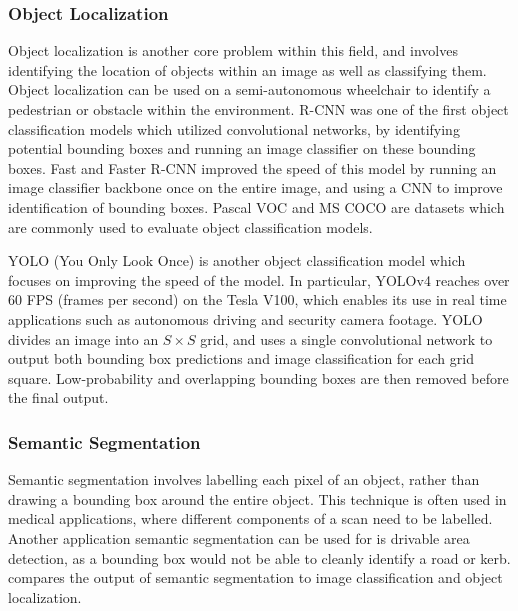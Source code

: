 \documentclass[12pt]{article}
\begin{document}
\subsubsection{Object Localization}
Object localization is another core problem within this field, and involves identifying the location of objects within an image
as well as classifying them. Object localization can be used on a semi-autonomous wheelchair to identify
a pedestrian or obstacle within the environment. R-CNN \cite{girshickRichFeatureHierarchies2013} was one of the
first object classification models which utilized convolutional networks, by identifying potential bounding boxes
and running an image classifier on these bounding boxes. Fast and Faster R-CNN \cite{girshickFastRCNN2015}\cite{renFasterRCNNRealTime2015}
improved the speed of this model by running an image classifier backbone once on the entire image, and using a CNN to improve
identification of bounding boxes. Pascal VOC \cite{everinghamPascalVisualObject2009} and MS COCO \cite{linMicrosoftCOCOCommon2014}
are datasets which are commonly used to evaluate object classification models.

YOLO (You Only Look Once) \cite{redmonYouOnlyLook2015}\cite{redmonYOLO9000BetterFaster2016}\cite{redmonYOLOv3IncrementalImprovement2018}\cite{bochkovskiyYOLOv4OptimalSpeed2020}
is another object classification model which focuses on improving the speed of the model. In particular, YOLOv4 \cite{bochkovskiyYOLOv4OptimalSpeed2020}
reaches over 60 FPS (frames per second) on the Tesla V100, which enables its use in real time applications such as autonomous driving and security camera footage. %
YOLO divides an image into an $S\times S$ grid, and uses a single convolutional network to output both bounding box predictions and
image classification for each grid square. Low-probability and overlapping bounding boxes are then removed before the final output.

\subsubsection{Semantic Segmentation}
Semantic segmentation involves labelling each pixel of an object, rather than drawing a bounding box around the entire object.
This technique is often used in medical applications, where different components of a scan need to be labelled.
Another application semantic segmentation can be used for is drivable area detection, as a bounding box would not be able to cleanly
identify a road or kerb.  compares the output of semantic segmentation to image classification and object localization.
\end{document}
